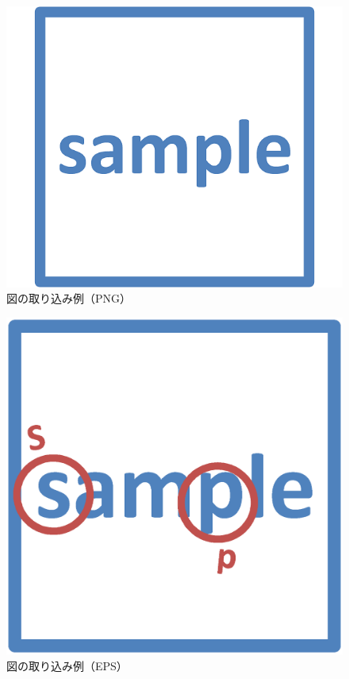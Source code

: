 \documentclass[12pt]{sonota/aislab}
\begin{document}
\begin{figure}[tbp]
	\centering %
	\includegraphics[width=12truecm]{sample01.png}
	\caption{図の取り込み例（PNG）}
	\label{fig:sample_png}
\end{figure}

\begin{figure}[tbp]
	\centering %
	\includegraphics[width=12truecm]{sample02.eps}
	\caption{図の取り込み例（EPS）}
	\label{fig:sample_eps}
\end{figure}
\end{document}
